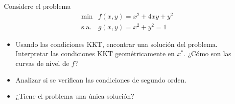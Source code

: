 \documentclass{article}
\newenvironment{theorem}[2][Ejercicio]{\begin{trivlist}
\item[\hskip \labelsep {\bfseries #1}\hskip \labelsep {\bfseries #2.}]}{\end{trivlist}}
\begin{document}
\begin{theorem}{9}
    Considere el problema
    \[
        \begin{array}{ll}
            \min        & f(x, y) = x^2 + 4xy + y^2 \\
            \text{s.a.} & g(x, y) = x^2 + y^2 = 1
        \end{array}
    \]
    \begin{itemize}
        \item[(a)] Usando las condiciones KKT, encontrar una solución del problema. Interpretar las condiciones KKT geométricamente en \( x^* \). ¿Cómo son las curvas de nivel de \( f \)?
        \item[(b)] Analizar si se verifican las condiciones de segundo orden.
        \item[(c)] ¿Tiene el problema una única solución?
    \end{itemize}
\end{theorem}
\end{document}
